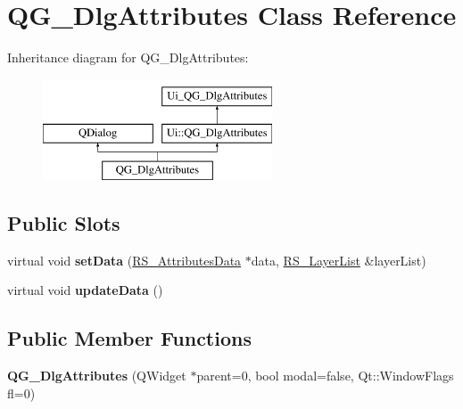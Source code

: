 \hypertarget{classQG__DlgAttributes}{\section{Q\-G\-\_\-\-Dlg\-Attributes Class Reference}
\label{classQG__DlgAttributes}
}
Inheritance diagram for Q\-G\-\_\-\-Dlg\-Attributes\-:\begin{figure}[H]
\begin{center}
\leavevmode
\includegraphics[height=3.000000cm]{classQG__DlgAttributes}
\end{center}
\end{figure}
\subsection*{Public Slots}
\begin{DoxyCompactItemize}
\item 
\hypertarget{classQG__DlgAttributes_a4860fcbf5049c2d6c673b5b9ff788bf6}{virtual void {\bfseries set\-Data} (\hyperlink{classRS__AttributesData}{R\-S\-\_\-\-Attributes\-Data} $\ast$data, \hyperlink{classRS__LayerList}{R\-S\-\_\-\-Layer\-List} \&layer\-List)}\label{classQG__DlgAttributes_a4860fcbf5049c2d6c673b5b9ff788bf6}

\item 
\hypertarget{classQG__DlgAttributes_a2a3224019310cac0511cad7e14d4242d}{virtual void {\bfseries update\-Data} ()}\label{classQG__DlgAttributes_a2a3224019310cac0511cad7e14d4242d}

\end{DoxyCompactItemize}
\subsection*{Public Member Functions}
\begin{DoxyCompactItemize}
\item 
\hypertarget{classQG__DlgAttributes_a2484f762b2267803e7ca32c26737ef14}{{\bfseries Q\-G\-\_\-\-Dlg\-Attributes} (Q\-Widget $\ast$parent=0, bool modal=false, Qt\-::\-Window\-Flags fl=0)}\label{classQG__DlgAttributes_a2484f762b2267803e7ca32c26737ef14}

\end{DoxyCompactItemize}
